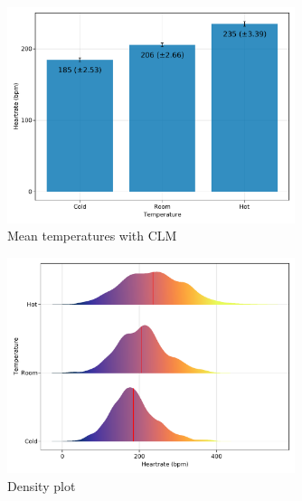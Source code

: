 \documentclass[a4paper, british]{article}
\begin{document}
\begin{figure}[htb]
    \centering
    \includegraphics[width=0.75\textwidth]{figures/plot1.pdf}
    \caption{Mean temperatures with CLM}
    \label{fig:mean}
\end{figure}

\begin{figure}[htb]
    \centering
    \includegraphics[width=0.75\textwidth]{figures/plot2.pdf}
    \caption{Density plot}
    \label{fig:density}
\end{figure}

\end{document}
